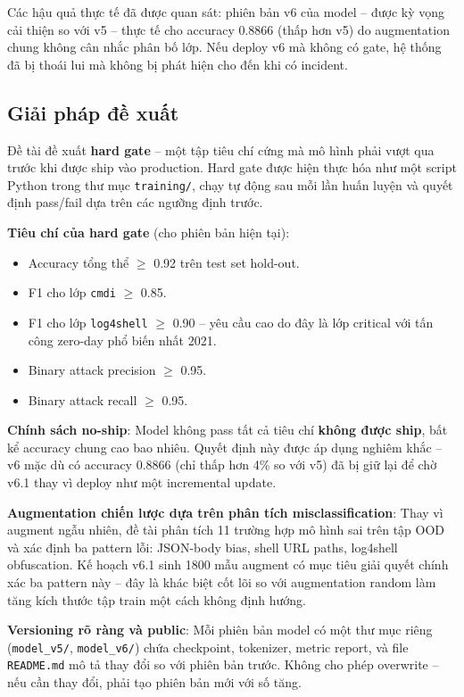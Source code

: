 \documentclass[../DoAn.tex]{subfiles}
\begin{document}
Các hậu quả thực tế đã được quan sát: phiên bản v6 của model -- được kỳ
vọng cải thiện so với v5 -- thực tế cho accuracy 0.8866 (thấp hơn v5) do
augmentation chung không cân nhắc phân bố lớp. Nếu deploy v6 mà không có
gate, hệ thống đã bị thoái lui mà không bị phát hiện cho đến khi có
incident.

\subsection{Giải pháp đề xuất}
\label{subsection:5.3.2}

Đề tài đề xuất \textbf{hard gate} -- một tập tiêu chí cứng mà mô hình phải
vượt qua trước khi được ship vào production. Hard gate được hiện thực hóa
như một script Python trong thư mục \texttt{training/}, chạy tự động sau
mỗi lần huấn luyện và quyết định pass/fail dựa trên các ngưỡng định trước.

\textbf{Tiêu chí của hard gate} (cho phiên bản hiện tại):
\begin{itemize}[leftmargin=*]
    \item Accuracy tổng thể \(\ge\) 0.92 trên test set hold-out.
    \item F1 cho lớp \texttt{cmdi} \(\ge\) 0.85.
    \item F1 cho lớp \texttt{log4shell} \(\ge\) 0.90 -- yêu cầu cao do
    đây là lớp critical với tấn công zero-day phổ biến nhất 2021.
    \item Binary attack precision \(\ge\) 0.95.
    \item Binary attack recall \(\ge\) 0.95.
\end{itemize}

\textbf{Chính sách no-ship}: Model không pass tất cả tiêu chí \textbf{không
được ship}, bất kể accuracy chung cao bao nhiêu. Quyết định này được áp
dụng nghiêm khắc -- v6 mặc dù có accuracy 0.8866 (chỉ thấp hơn 4\% so với
v5) đã bị giữ lại để chờ v6.1 thay vì deploy như một incremental update.

\textbf{Augmentation chiến lược dựa trên phân tích misclassification}:
Thay vì augment ngẫu nhiên, đề tài phân tích 11 trường hợp mô hình sai
trên tập OOD và xác định ba pattern lỗi: JSON-body bias, shell URL paths,
log4shell obfuscation. Kế hoạch v6.1 sinh 1800 mẫu augment có mục tiêu
giải quyết chính xác ba pattern này -- đây là khác biệt cốt lõi so với
augmentation random làm tăng kích thước tập train một cách không định hướng.

\textbf{Versioning rõ ràng và public}: Mỗi phiên bản model có một thư mục
riêng (\texttt{model\_v5/}, \texttt{model\_v6/}) chứa checkpoint, tokenizer,
metric report, và file \texttt{README.md} mô tả thay đổi so với phiên bản
trước. Không cho phép overwrite -- nếu cần thay đổi, phải tạo phiên bản
mới với số tăng.
\end{document}
